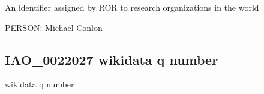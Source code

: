 \documentclass[letterpaper,10pt,english]{sphinxmanual}
\begin{document}
\begin{sphinxShadowBox}

\sphinxAtStartPar
{\hyperref[\detokenize{doc-IAO_0000578::doc}]{}}
\end{sphinxShadowBox}

\begin{sphinxShadowBox}

\sphinxAtStartPar
An identifier assigned by ROR to research organizations in the world
\end{sphinxShadowBox}

\begin{sphinxShadowBox}

\sphinxAtStartPar
{}
\end{sphinxShadowBox}

\begin{sphinxShadowBox}

\sphinxAtStartPar
{}
\end{sphinxShadowBox}

\begin{sphinxShadowBox}

\sphinxAtStartPar
PERSON: Michael Conlon
\end{sphinxShadowBox}
\begin{quote}

\ignorespaces \end{quote}


\subsection{IAO\_0022027 \sphinxhyphen{} wikidata q number}
\label{\detokenize{doc-IAO_0022027:iao-0022027-wikidata-q-number}}\label{\detokenize{doc-IAO_0022027:index-0}}\label{\detokenize{doc-IAO_0022027::doc}}
\begin{sphinxShadowBox}

\sphinxAtStartPar
wikidata q number
\end{sphinxShadowBox}
\end{document}

